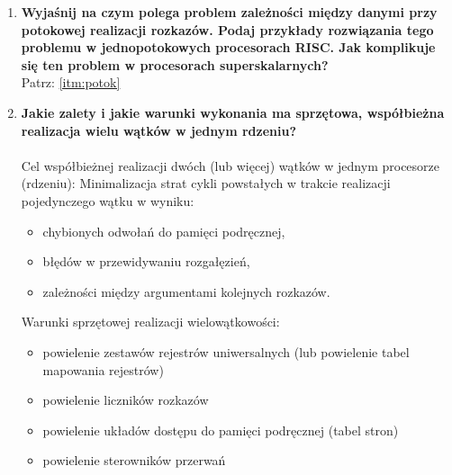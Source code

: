 \begin{enumerate}
			\item \textbf{Wyjaśnij na czym polega problem zależności między danymi przy potokowej realizacji rozkazów. Podaj przykłady rozwiązania tego problemu w jednopotokowych procesorach RISC. Jak komplikuje się ten problem w procesorach superskalarnych?}\\
			Patrz: \ref{itm:potok}
			
			\item \textbf{Jakie zalety i jakie warunki wykonania ma sprzętowa, współbieżna realizacja wielu wątków w jednym rdzeniu?}
			\label{itm:watek}\\\\
			Cel współbieżnej realizacji dwóch (lub więcej) wątków w jednym procesorze (rdzeniu): 
			Minimalizacja strat cykli powstałych w trakcie realizacji pojedynczego wątku w wyniku:
			\begin{itemize}
				\item chybionych odwołań do pamięci podręcznej, 
				\item błędów w przewidywaniu rozgałęzień, 
				\item zależności między argumentami kolejnych rozkazów.
			\end{itemize}
			Warunki sprzętowej realizacji wielowątkowości:
			\begin{itemize}
				\item powielenie zestawów rejestrów uniwersalnych (lub powielenie tabel mapowania rejestrów)
				\item powielenie liczników rozkazów
				\item powielenie układów dostępu do pamięci podręcznej (tabel stron)
				\item powielenie sterowników przerwań 
			\end{itemize}
		\end{enumerate}
	
